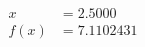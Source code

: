 \documentclass[preview]{standalone}
\begin{document}
\begin{align*}
x &= 2.5000\\f(x) &= 7.1102431
\end{align*}
\end{document}

